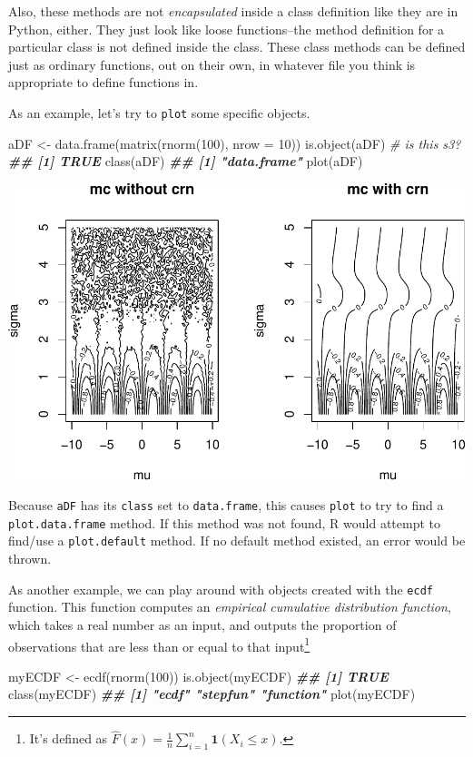 \documentclass[
  12pt,
  krantz2]{krantz}
\makeatletter
\newenvironment{Shaded}{\begin{snugshade}}{\end{snugshade}}
\newcommand{\AttributeTok}[1]{\textcolor[rgb]{0.61,0.61,0.61}{#1}}
\newcommand{\CommentTok}[1]{\textcolor[rgb]{0.37,0.37,0.37}{\textit{#1}}}
\newcommand{\DecValTok}[1]{\textcolor[rgb]{0.06,0.06,0.06}{#1}}
\newcommand{\DocumentationTok}[1]{\textcolor[rgb]{0.37,0.37,0.37}{\textbf{\textit{#1}}}}
\newcommand{\FunctionTok}[1]{\textcolor[rgb]{0,0,0}{#1}}
\newcommand{\NormalTok}[1]{#1}
\newcommand{\OtherTok}[1]{\textcolor[rgb]{0.37,0.37,0.37}{#1}}
\newenvironment{kframe}{%
\medskip{}
\setlength{\fboxsep}{.8em}
 \def\at@end@of@kframe{}%
 \ifinner\ifhmode%
  \def\at@end@of@kframe{\end{minipage}}%
  \begin{minipage}{\columnwidth}%
 \fi\fi%
 \def\FrameCommand##1{\hskip\@totalleftmargin \hskip-\fboxsep
 \colorbox{shadecolor}{##1}\hskip-\fboxsep
     \hskip-\linewidth \hskip-\@totalleftmargin \hskip\columnwidth}%
 \MakeFramed {\advance\hsize-\width
   \@totalleftmargin\z@ \linewidth\hsize
   \@setminipage}}%
 {\par\unskip\endMakeFramed%
 \at@end@of@kframe}
\renewenvironment{Shaded}{\begin{kframe}}{\end{kframe}}
\makeatother
\begin{document}
Also, these methods are not \emph{encapsulated} inside a class definition like they are in Python, either. They just look like loose functions--the method definition for a particular class is not defined inside the class. These class methods can be defined just as ordinary functions, out on their own, in whatever file you think is appropriate to define functions in.

As an example, let's try to \texttt{plot} some specific objects.

\begin{Shaded}
\begin{Highlighting}[]
\NormalTok{aDF }\OtherTok{\textless{}{-}} \FunctionTok{data.frame}\NormalTok{(}\FunctionTok{matrix}\NormalTok{(}\FunctionTok{rnorm}\NormalTok{(}\DecValTok{100}\NormalTok{), }\AttributeTok{nrow =} \DecValTok{10}\NormalTok{))}
\FunctionTok{is.object}\NormalTok{(aDF) }\CommentTok{\# is this s3?}
\DocumentationTok{\#\# [1] TRUE}
\FunctionTok{class}\NormalTok{(aDF)}
\DocumentationTok{\#\# [1] "data.frame"}
\FunctionTok{plot}\NormalTok{(aDF)}
\end{Highlighting}
\end{Shaded}

\includegraphics[width=0.5\linewidth]{r_and_python_book_files/figure-latex/unnamed-chunk-242-1}

Because \texttt{aDF} has its \texttt{class} set to \texttt{data.frame}, this causes \texttt{plot} to try to find a \texttt{plot.data.frame} method. If this method was not found, R would attempt to find/use a \texttt{plot.default} method. If no default method existed, an error would be thrown.

As another example, we can play around with objects created with the \texttt{ecdf} function. This function computes an \emph{empirical cumulative distribution function}, which takes a real number as an input, and outputs the proportion of observations that are less than or equal to that input\footnote{It's defined as \(\hat{F}(x) = \frac{1}{n}\sum_{i=1}^n \mathbf{1}(X_i \le x)\).}

\begin{Shaded}
\begin{Highlighting}[]
\NormalTok{myECDF }\OtherTok{\textless{}{-}} \FunctionTok{ecdf}\NormalTok{(}\FunctionTok{rnorm}\NormalTok{(}\DecValTok{100}\NormalTok{))}
\FunctionTok{is.object}\NormalTok{(myECDF)}
\DocumentationTok{\#\# [1] TRUE}
\FunctionTok{class}\NormalTok{(myECDF)}
\DocumentationTok{\#\# [1] "ecdf"     "stepfun"  "function"}
\FunctionTok{plot}\NormalTok{(myECDF)}
\end{Highlighting}
\end{Shaded}
\end{document}
